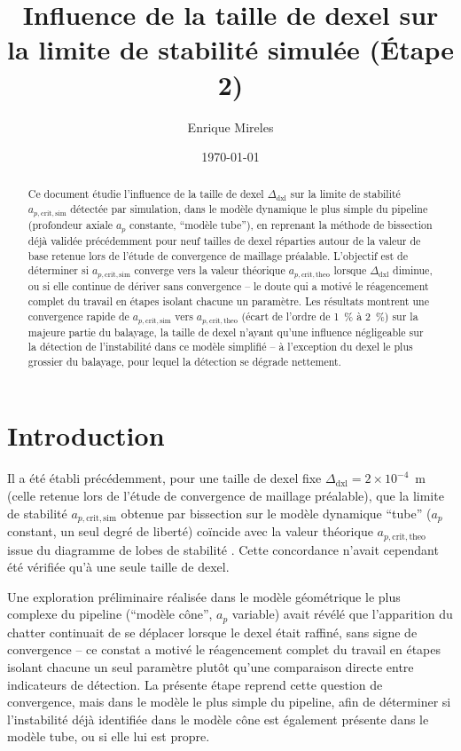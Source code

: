 \documentclass[
    11pt,
    a4paper
]{article}
\title{
    \textbf{Influence de la taille de dexel sur la limite de stabilité simulée (Étape 2)}
}
\author{
    Enrique Mireles
}
\date{\today}
\newcommand{\ap}{a_p}
\newcommand{\apcrittheo}{a_{p,\mathrm{crit,theo}}}
\newcommand{\apcritsim}{a_{p,\mathrm{crit,sim}}}
\newcommand{\dxlsize}{\Delta_{\mathrm{dxl}}}
\begin{document}
\maketitle

\begin{abstract}

Ce document étudie l'influence de la taille de dexel \(\dxlsize\) sur la limite de
stabilité \(\apcritsim\) détectée par simulation, dans le modèle dynamique le plus simple
du pipeline (profondeur axiale \(\ap\) constante, \enquote{modèle tube}), en reprenant la
méthode de bissection déjà validée précédemment pour neuf tailles de dexel réparties autour
de la valeur de base retenue lors de l'étude de convergence de maillage préalable.
L'objectif est de déterminer si \(\apcritsim\) converge vers la
valeur théorique \(\apcrittheo\) lorsque \(\dxlsize\) diminue, ou si elle continue de dériver
sans convergence -- le doute qui a motivé le réagencement complet du travail en étapes
isolant chacune un paramètre. Les résultats montrent une convergence rapide de
\(\apcritsim\) vers \(\apcrittheo\) (écart de l'ordre de \SI{1}{\percent} à \SI{2}{\percent})
sur la majeure partie du balayage, la taille de dexel n'ayant qu'une influence négligeable
sur la détection de l'instabilité dans ce modèle simplifié -- à l'exception du dexel le plus
grossier du balayage, pour lequel la détection se dégrade nettement.

\end{abstract}

\tableofcontents

\newpage

\section{Introduction}
\label{sec-introduction}

Il a été établi précédemment, pour une taille de dexel fixe \(\dxlsize = 2\times10^{-4}\)~m
(celle retenue lors de l'étude de convergence de maillage préalable), que la limite de
stabilité \(\apcritsim\) obtenue par bissection sur le
modèle dynamique \enquote{tube} (\(\ap\) constant, un seul degré de liberté) coïncide avec la
valeur théorique \(\apcrittheo\) issue du diagramme de lobes de stabilité
. Cette concordance n'avait cependant été vérifiée qu'à une seule taille de dexel.

Une exploration préliminaire réalisée dans le modèle géométrique le plus complexe du
pipeline (\enquote{modèle cône}, \(\ap\) variable) avait révélé que l'apparition du chatter
continuait de se déplacer lorsque le dexel était raffiné, sans signe de convergence -- ce
constat a motivé le réagencement complet du travail en étapes isolant chacune un seul
paramètre plutôt qu'une comparaison directe entre indicateurs de détection. La présente
étape reprend cette question de convergence, mais dans le modèle le plus simple du
pipeline, afin de déterminer si l'instabilité déjà identifiée dans le modèle cône est
également présente dans le modèle tube, ou si elle lui est propre.
\end{document}
